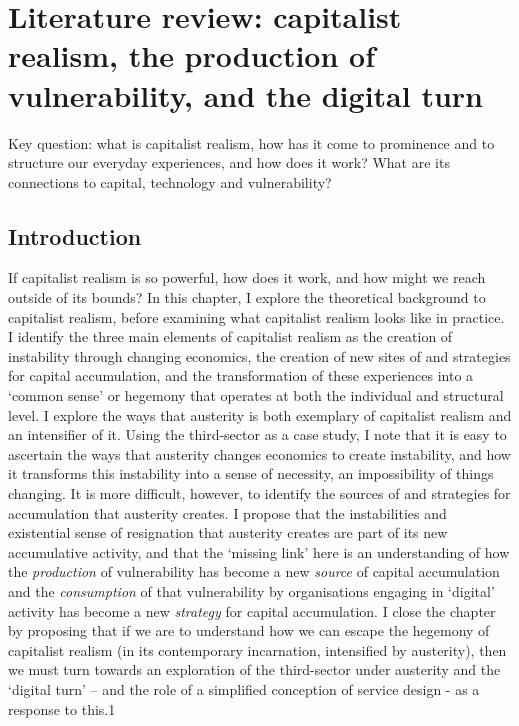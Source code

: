 \chapter{Literature review: capitalist realism, the production of vulnerability, and the digital turn}
 \label{2}

Key question: what is capitalist realism, how has it come to prominence and to structure our everyday experiences, and how does it work? What are its connections to capital, technology and vulnerability?

\section{Introduction}
\label{2-intro}

If capitalist realism is so powerful, how does it work, and how might we reach outside of its bounds? In this chapter, I explore the theoretical background to capitalist realism, before examining what capitalist realism looks like in practice. I identify the three main elements of capitalist realism as the creation of instability through changing economics, the creation of new sites of and strategies for capital accumulation, and the transformation of these experiences into a `common sense' or hegemony that operates at both the individual and structural level. I explore the ways that austerity is both exemplary of capitalist realism and an intensifier of it. Using the third-sector as a case study, I note that it is easy to ascertain the ways that austerity changes economics to create instability, and how it transforms this instability into a sense of necessity, an impossibility of things changing. It is more difficult, however, to identify the sources of and strategies for accumulation that austerity creates. I propose that the instabilities and existential sense of resignation that austerity creates are part of its new accumulative activity, and that the `missing link' here is an understanding of how the \emph{production} of vulnerability has become a new \emph{source} of capital accumulation and the \emph{consumption} of that vulnerability by organisations engaging in `digital' activity has become a new \emph{strategy} for capital accumulation. I close the chapter by proposing that if we are to understand how we can escape the hegemony of capitalist realism (in its contemporary incarnation, intensified by austerity), then we must turn towards an exploration of the third-sector under austerity and the `digital turn' -- and the role of a simplified conception of service design - as a response to this.1

